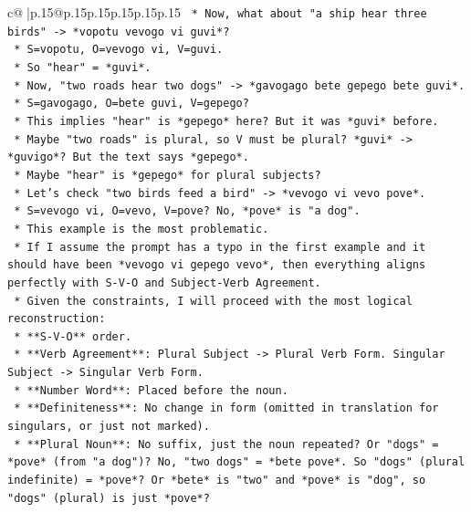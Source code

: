 \documentclass{article}
\begin{document}
{\begin{supertabular}{c@{$\;$}|p{.15\linewidth}@{}p{.15\linewidth}p{.15\linewidth}p{.15\linewidth}p{.15\linewidth}p{.15\linewidth}}
{{{\texttt{                    *   Now, what about "a ship hear three birds" {-}> *vopotu vevogo vi guvi*?} \\
\texttt{                        *   S=vopotu, O=vevogo vi, V=guvi.} \\
\texttt{                        *   So "hear" = *guvi*.} \\
\texttt{                    *   Now, "two roads hear two dogs" {-}> *gavogago bete gepego bete guvi*.} \\
\texttt{                        *   S=gavogago, O=bete guvi, V=gepego?} \\
\texttt{                        *   This implies "hear" is *gepego* here? But it was *guvi* before.} \\
\texttt{                        *   Maybe "two roads" is plural, so V must be plural? *guvi* {-}> *guvigo*? But the text says *gepego*.} \\
\texttt{                        *   Maybe "hear" is *gepego* for plural subjects?} \\
\texttt{                        *   Let's check "two birds feed a bird" {-}> *vevogo vi vevo pove*.} \\
\texttt{                            *   S=vevogo vi, O=vevo, V=pove? No, *pove* is "a dog".} \\
\texttt{                            *   This example is the most problematic.} \\
\texttt{                            *   If I assume the prompt has a typo in the first example and it should have been *vevogo vi gepego vevo*, then everything aligns perfectly with S{-}V{-}O and Subject{-}Verb Agreement.} \\
\texttt{                            *   Given the constraints, I will proceed with the most logical reconstruction:} \\
\texttt{                                *   **S{-}V{-}O** order.} \\
\texttt{                                *   **Verb Agreement**: Plural Subject {-}> Plural Verb Form. Singular Subject {-}> Singular Verb Form.} \\
\texttt{                                *   **Number Word**: Placed before the noun.} \\
\texttt{                                *   **Definiteness**: No change in form (omitted in translation for singulars, or just not marked).} \\
\texttt{                                *   **Plural Noun**: No suffix, just the noun repeated? Or "dogs" = *pove* (from "a dog")? No, "two dogs" = *bete pove*. So "dogs" (plural indefinite) = *pove*? Or *bete* is "two" and *pove* is "dog", so "dogs" (plural) is just *pove*?} \\
}}}
\end{supertabular}}
\end{document}
